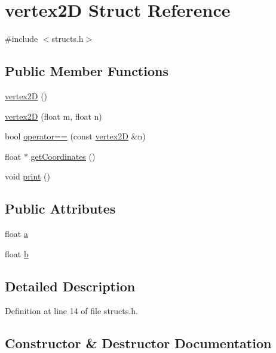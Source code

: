 \hypertarget{structvertex2_d}{}\section{vertex2D Struct Reference}
\label{structvertex2_d}


{\ttfamily \#include $<$structs.\+h$>$}

\subsection*{Public Member Functions}
\begin{DoxyCompactItemize}
\item 
\mbox{\hyperlink{structvertex2_d_a51595eaa5e6195ffcfa8da8a2331c88e}{vertex2D}} ()
\item 
\mbox{\hyperlink{structvertex2_d_a146dcb0c51e1994fb61e92fdf943197c}{vertex2D}} (float m, float n)
\item 
bool \mbox{\hyperlink{structvertex2_d_a3ae69a0028a3d45d339daacd7918e67a}{operator==}} (const \mbox{\hyperlink{structvertex2_d}{vertex2D}} \&n)
\item 
float $\ast$ \mbox{\hyperlink{structvertex2_d_abf1f2b45c9ea667e4b32618596e7f2b1}{get\+Coordinates}} ()
\item 
void \mbox{\hyperlink{structvertex2_d_a32655e7a17f960cf0b997a7537b06d26}{print}} ()
\end{DoxyCompactItemize}
\subsection*{Public Attributes}
\begin{DoxyCompactItemize}
\item 
float \mbox{\hyperlink{structvertex2_d_afef4fe9f03de3deeafb9806f144bcd28}{a}}
\item 
float \mbox{\hyperlink{structvertex2_d_a7f6118b6b5c6112a2538abfe341e420e}{b}}
\end{DoxyCompactItemize}


\subsection{Detailed Description}


Definition at line 14 of file structs.\+h.



\subsection{Constructor \& Destructor Documentation}
\mbox{\label{structvertex2_d_a51595eaa5e6195ffcfa8da8a2331c88e}} 
